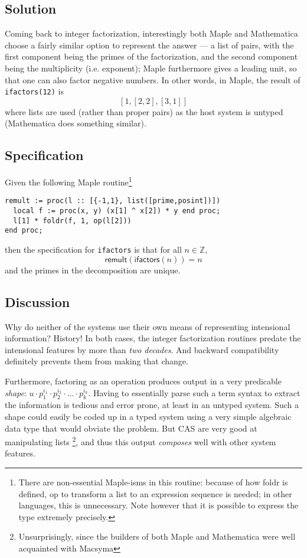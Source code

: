 \documentclass[fleqn]{llncs}
\begin{document}
\subsection{Solution}

Coming back to integer factorization, interestingly both Maple and
Mathematica choose a fairly similar option to represent the answer ---
a list of pairs, with the first component being the primes of the
factorization, and the second component being the multiplicity (i.e.
exponent); Maple furthermore gives a leading unit, so that one can also
factor negative numbers. In other words, in Maple, the result of
\texttt{ifactors(12)} is
\[ \left[ 1, \left[2,2\right], \left[3,1\right]\right] \]
where lists are used (rather than proper pairs) as the host system is
untyped (Mathematica does something similar).

\subsection{Specification}

Given the following Maple routine\footnote{There are non-essential
Maple-isms in this routine: because of how \textsf{foldr} is defined,
\textsf{op} to transform a list to an expression sequence is needed;
in other languages, this is unnecessary. Note however that it is
possible to express the type extremely precisely.}
\begin{verbatim}
remult := proc(l :: [{-1,1}, list([prime,posint])]) 
  local f := proc(x, y) (x[1] ^ x[2]) * y end proc;
  l[1] * foldr(f, 1, op(l[2]))
end proc; 
\end{verbatim}
\noindent then the specification for \texttt{ifactors} is that
for all $n\in \mathbb{Z}$,
\[ \mathsf{remult}\left(\mathsf{ifactors}\left(n\right)\right) = n \]
and the primes in the decomposition are unique.

\subsection{Discussion}

Why do neither of the systems use their own means of representing 
intensional information? History! In both cases, the integer factorization
routines predate the intensional features by more than \emph{two decades}.
And backward compatibility definitely prevents them from making that
change.

Furthermore, factoring as an operation produces output in a very predicable
\emph{shape}: $u\cdot p_1^{i_1} \cdot p_2^{i_2} \cdot \ldots \cdot p_k^{i_k}$.
Having to essentially parse such a term syntax to extract the information is
tedious and error prone, at least in an untyped system. Such a shape could
easily be coded up in a typed system using a very simple algebraic data type
that would obviate the problem. But CAS are very good at manipulating lists%
\footnote{Unsurprisingly, since the builders of both Maple and Mathematica
were well acquainted with Macsyma}, and thus this output \emph{composes}
well with other system features.
\end{document}
